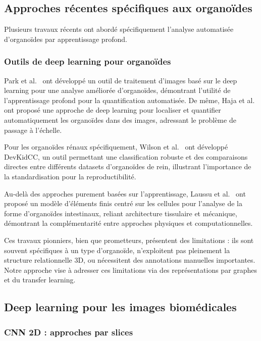 \subsection{Approches récentes spécifiques aux organoïdes}

Plusieurs travaux récents ont abordé spécifiquement l'analyse automatisée d'organoïdes par apprentissage profond.

\subsubsection{Outils de deep learning pour organoïdes}

Park et al.~\cite{Park2023} ont développé un outil de traitement d'images basé sur le deep learning pour une analyse améliorée d'organoïdes, démontrant l'utilité de l'apprentissage profond pour la quantification automatisée. De même, Haja et al.~\cite{Haja2023} ont proposé une approche de deep learning pour localiser et quantifier automatiquement les organoïdes dans des images, adressant le problème de passage à l'échelle.

Pour les organoïdes rénaux spécifiquement, Wilson et al.~\cite{Wilson2022} ont développé DevKidCC, un outil permettant une classification robuste et des comparaisons directes entre différents datasets d'organoïdes de rein, illustrant l'importance de la standardisation pour la reproductibilité.

Au-delà des approches purement basées sur l'apprentissage, Laussu et al.~\cite{Laussu2024} ont proposé un modèle d'éléments finis centré sur les cellules pour l'analyse de la forme d'organoïdes intestinaux, reliant architecture tissulaire et mécanique, démontrant la complémentarité entre approches physiques et computationnelles.

Ces travaux pionniers, bien que prometteurs, présentent des limitations : ils sont souvent spécifiques à un type d'organoïde, n'exploitent pas pleinement la structure relationnelle 3D, ou nécessitent des annotations manuelles importantes. Notre approche vise à adresser ces limitations via des représentations par graphes et du transfer learning.

\subsection{Deep learning pour les images biomédicales}

\subsubsection{CNN 2D : approches par slices}

